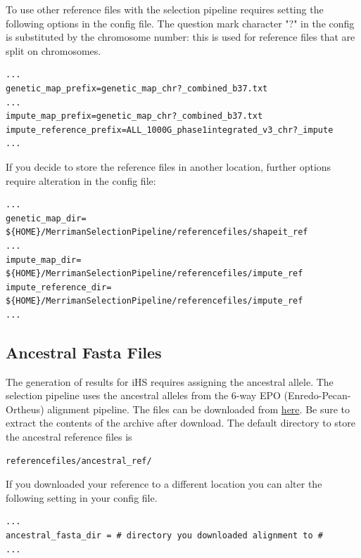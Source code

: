 \documentclass[a4paper,10pt]{article}
\begin{document}
To use other reference files with the selection pipeline requires
setting the following options in the config file. The question mark character
"?" in the config is substituted by the chromosome number: this is
used for reference files that are split on chromosomes.\\


\begin{verbatim}
...
genetic_map_prefix=genetic_map_chr?_combined_b37.txt
...
impute_map_prefix=genetic_map_chr?_combined_b37.txt
impute_reference_prefix=ALL_1000G_phase1integrated_v3_chr?_impute
...
\end{verbatim}

\noindent
If you decide to store the reference files in another location,
further options require alteration in the config file:\\ 
\begin{verbatim}
...
genetic_map_dir= ${HOME}/MerrimanSelectionPipeline/referencefiles/shapeit_ref
...
impute_map_dir= ${HOME}/MerrimanSelectionPipeline/referencefiles/impute_ref
impute_reference_dir= ${HOME}/MerrimanSelectionPipeline/referencefiles/impute_ref
...
\end{verbatim}

\subsection{Ancestral Fasta Files}
The generation of results for iHS requires assigning the ancestral
allele. The selection pipeline uses the ancestral alleles from the
6-way EPO (Enredo-Pecan-Ortheus) alignment pipeline. The files can be
downloaded from
\href{ftp://ftp.1000genomes.ebi.ac.uk/vol1/ftp/phase1/analysis_results/supporting/ancestral_alignments/human_ancestor_GRCh37_e59.tar.bz2}{here}. Be
sure to extract the contents of the archive after download. The default
directory to store the ancestral reference files is\\
\begin{verbatim}
referencefiles/ancestral_ref/
\end{verbatim}

\noindent
If you downloaded your reference to a different location you can alter the following setting in your config file.\\
\begin{verbatim}
...
ancestral_fasta_dir = # directory you downloaded alignment to #
...
\end{verbatim}
\end{document}
